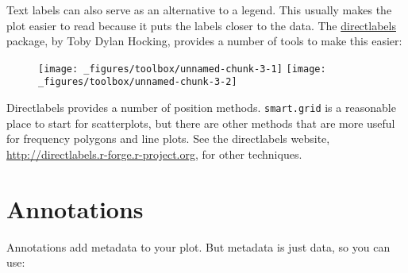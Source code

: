 Text labels can also serve as an alternative to a legend. This usually
makes the plot easier to read because it puts the labels closer to the
data. The \href{https://github.com/tdhock/directlabels}{directlabels}
package, by Toby Dylan Hocking, provides a number of tools to make this
easier: 

\begin{Shaded}
\begin{Highlighting}[]
 \StringTok{ }
\StringTok{  }\NormalTok{()}

 \StringTok{ }
\StringTok{  }\NormalTok{(} \NormalTok{) +}
\StringTok{  }\NormalTok{(}\NormalTok{(}  \NormalTok{)}
\end{Highlighting}
\end{Shaded}

\begin{figure}[H]
  \texttt{[image: \_figures/toolbox/unnamed-chunk-3-1]}%
  \texttt{[image: \_figures/toolbox/unnamed-chunk-3-2]}
\end{figure}

Directlabels provides a number of position methods. \texttt{smart.grid}
is a reasonable place to start for scatterplots, but there are other
methods that are more useful for frequency polygons and line plots. See
the directlabels website,
\url{http://directlabels.r-forge.r-project.org}, for other techniques.

\hypertarget{sec:annotations}{\section{Annotations}\label{sec:annotations}}

Annotations add metadata to your plot. But metadata is just data, so you
can use:  

